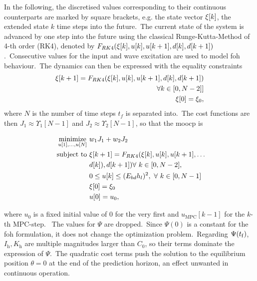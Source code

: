 In the following, the discretised values corresponding to their continuous counterparts are marked by square brackets, e.g. the state vector $\xi[k]$, the extended state $k$ time steps into the future.\ 
The current state of the system is advanced by one step into the future using the classical Runge-Kutta-Method of 4-th order (RK4), denoted by $F_{RK4}(\xi[k], u[k], u[k+1], d[k], d[k+1])$.\ 
Consecutive values for the input and wave excitation are used to model \ac{foh} behaviour.\ 
The dynamics can then be expressed with the equality constraints
\begin{align*}
	\xi[k+1] = F_{RK4}(\xi[k], u[k], u[k+1], d[k], d[k+1]) \\
	\forall k\in\left[0,N-2]\right]\\
	\xi[0] = \xi_0,
\end{align*}
where $N$ is the number of time steps $t_f$ is separated into.\ 
The cost functions are then $J_1 \approx \Upsilon_1[N-1]$ and $J_2 \approx \Upsilon_2[N-1]$, so that the \ac{moocp} is
\begin{problem}\label{pb:problem_disc}
	\begin{align}\label{eq:problem2}
		\operatorname*{minimize}_{u[1],\ldots,u[N]} \ &w_1 J_1 + w_2 J_2 \nonumber\\
		\ \text{subject to} \ & \xi[k+1] = F_{RK4}(\xi[k], u[k], u[k+1],\dots\nonumber\\ &d[k]), d[k+1])  \forall \ k \in [0, N-2], \nonumber\\
		&0 \le  u[k] \le (E_{bd} h_l)^2, \ \forall \ k \in [0, N-1]\\
		& \xi[0] = \xi_0\\
		& u[0] = u_0,
	\end{align}
\end{problem}
where $u_0$ is a fixed initial value of 0 for the very first and $u_\mathrm{MPC}[k-1]$ for the $k$-th MPC-step. \
The values for $\Psi$ are dropped.\ 
Since $\Psi(0)$ is a constant for the \ac{foh} formulation, it does not change the optimization problem.\ 
Regarding $\Psi(t_\mathrm{f})$, $I_\mathrm{h}, K_\mathrm{h}$ are multiple magnitudes larger than $C_0$, so their terms dominate the expression of $\Psi$.\ 
The quadratic cost terms push the solution to the equilibrium position $\theta = 0$ at the end of the prediction horizon, an effect unwanted in continuous operation.

